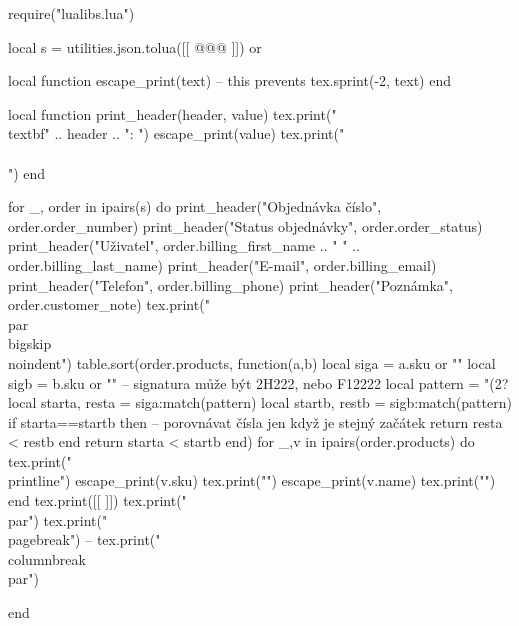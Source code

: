 \documentclass[landscape,a4page]{article}
\begin{document}
\columnseprule=0.3pt
\columnsep=20pt
\parindent=0pt
\parskip=2pt
\newcommand\printline[2]{\parbox{.2\linewidth}{#1}~\parbox{.7\linewidth}{#2}\\}

\begin{multicols*}{3}
  \sloppy

\begin{luacode*}
require("lualibs.lua")

local s =  utilities.json.tolua([[
@@@
]]) or {}



local function escape_print(text)
  -- this prevents
  tex.sprint(-2, text)
end

local function print_header(header, value)
  tex.print("\\textbf{" .. header .. ":} ")
  escape_print(value)
  tex.print("\\\\")
end


for _, order in ipairs(s) do
  print_header("Objednávka číslo", order.order_number)
  print_header("Status objednávky", order.order_status)
  print_header("Uživatel", order.billing_first_name .. " " .. order.billing_last_name)
  print_header("E-mail", order.billing_email)
  print_header("Telefon", order.billing_phone)
  print_header("Poznámka", order.customer_note)
  tex.print("\\par\\bigskip\\noindent")
  table.sort(order.products, function(a,b)
    local siga = a.sku or ""
    local sigb = b.sku or ""
    -- signatura může být 2H222, nebo F12222
    local pattern = "(2?%
    local starta, resta = siga:match(pattern)
    local startb, restb = sigb:match(pattern)
    if starta==startb then
      -- porovnávat čísla jen když je stejný začátek
      return resta < restb 
    end
    return starta < startb
  end)
  for _,v in ipairs(order.products) do
    tex.print("\\printline{")
    escape_print(v.sku)
    tex.print("}{")
    escape_print(v.name)
  tex.print("}")
  end
  tex.print([[
  \vfill
  \null
  ]])
  tex.print("\\par")
  tex.print("\\pagebreak")
  -- tex.print("\\columnbreak\\par")


end



\end{luacode*}
\end{multicols*}
\end{document}
